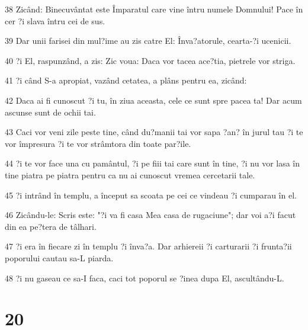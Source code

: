 \par 38 Zicând: Binecuvântat este Împaratul care vine întru numele Domnului! Pace în cer ?i slava întru cei de sus.
\par 39 Dar unii farisei din mul?ime au zis catre El: Înva?atorule, cearta-?i ucenicii.
\par 40 ?i El, raspunzând, a zis: Zic voua: Daca vor tacea ace?tia, pietrele vor striga.
\par 41 ?i când S-a apropiat, vazând cetatea, a plâns pentru ea, zicând:
\par 42 Daca ai fi cunoscut ?i tu, în ziua aceasta, cele ce sunt spre pacea ta! Dar acum ascunse sunt de ochii tai.
\par 43 Caci vor veni zile peste tine, când du?manii tai vor sapa ?an? în jurul tau ?i te vor împresura ?i te vor strâmtora din toate par?ile.
\par 44 ?i te vor face una cu pamântul, ?i pe fiii tai care sunt în tine, ?i nu vor lasa în tine piatra pe piatra pentru ca nu ai cunoscut vremea cercetarii tale.
\par 45 ?i intrând în templu, a început sa scoata pe cei ce vindeau ?i cumparau în el.
\par 46 Zicându-le: Scris este: "?i va fi casa Mea casa de rugaciune"; dar voi a?i facut din ea pe?tera de tâlhari.
\par 47 ?i era în fiecare zi în templu ?i înva?a. Dar arhiereii ?i carturarii ?i frunta?ii poporului cautau sa-L piarda.
\par 48 ?i nu gaseau ce sa-I faca, caci tot poporul se ?inea dupa El, ascultându-L.

\chapter{20}

